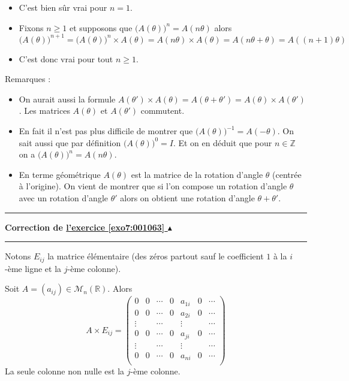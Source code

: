 \documentclass[11pt,a4paper]{article}
\newcommand{\Zz}{\mathbb{Z}} \newcommand{\Z}{\mathbb{Z}}
\newcommand{\Rr}{\mathbb{R}} \newcommand{\R}{\mathbb{R}}
\renewcommand{\ge}{\geqslant} \renewcommand{\geq}{\geqslant}
\newcounter{exo}
\newcommand{\correction}[1]{\hypertarget{cor7:#1}{}\label{cor7:#1}{\bf Correction de \hyperlink{exo7:#1}{l'exercice \ref{exo7:#1} $\blacktriangle$}}\vspace{1mm}\hrule\vspace{1mm}}
\newcommand{\fincorrection}{\vspace{1mm}\hrule\vspace*{7mm}}
\begin{document}
\begin{itemize}
  \item C'est bien sûr vrai pour $n=1$.
  \item Fixons $n\ge 1$ et supposons que $\big(A(\theta)\big)^n = A(n\theta)$ alors
$$\big(A(\theta)\big)^{n+1} = \big(A(\theta)\big)^n \times A(\theta) = A(n\theta) \times A(\theta) = A(n\theta+\theta) = A((n+1)\theta)$$
  \item C'est donc vrai pour tout $n\ge 1$.
\end{itemize}


Remarques :
\begin{itemize}
  \item On aurait aussi la formule $A(\theta')\times A(\theta) = A(\theta+\theta') = A(\theta)\times A(\theta')$.
Les matrices $A(\theta)$ et $A(\theta')$ commutent.

  \item En fait il n'est pas plus difficile de montrer que $\big(A(\theta)\big)^{-1}=A(-\theta)$.
On sait aussi que par définition $\big(A(\theta)\big)^{0}=I$. Et on en déduit que pour $n\in \Zz$ on a 
$\big(A(\theta)\big)^n = A(n\theta)$.

  \item En terme géométrique $A(\theta)$ est la matrice de la rotation d'angle $\theta$ (centrée à l'origine).
On vient de montrer que si l'on compose un rotation d'angle $\theta$ avec un rotation d'angle $\theta'$
alors on obtient une rotation d'angle $\theta+\theta'$.
\end{itemize}

\fincorrection
\correction{001063}
Notons $E_{ij}$ la matrice élémentaire (des zéros partout sauf le coefficient $1$ à la
 $i$-ème ligne et la $j$-ème colonne).

Soit $A = (a_{ij})  \in \mathcal{M}_n(\Rr)$.
Alors 
$$A \times E_{ij} = 
\begin{pmatrix}  
0 & 0 & \cdots & 0 & a_{1i} & 0 & \cdots \\
0 & 0 & \cdots & 0 & a_{2i} & 0 & \cdots \\
\vdots&  & \cdots & & \vdots &  & \cdots \\
0 & 0 & \cdots & 0 & a_{ji} & 0 & \cdots \\
\vdots&  & \cdots & & \vdots &  & \cdots \\
0 & 0 & \cdots & 0 & a_{ni} & 0 & \cdots \\
\end{pmatrix}$$
La seule colonne non nulle est la $j$-ème colonne.
\end{document}
